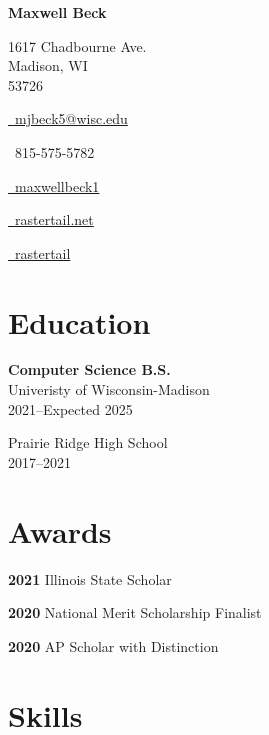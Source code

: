 \documentclass[letterpaper,10pt]{article}
\begin{document}
\raggedright
\begin{paracol}{2}

    \begin{center}

        {\LARGE \bfseries Maxwell Beck}

        \medskip

        1617 Chadbourne Ave. \\
        Madison, WI \\
        53726 \\

        \medskip

        \href{mailto:mjbeck5@wisc.edu}{\faEnvelopeO\, mjbeck5@wisc.edu}

        \faPhone\,
        815-575-5782

        \href{https://www.linkedin.com/in/maxwellbeck1}{\faLinkedin\, maxwellbeck1}

        \href{https://rastertail.net/}{\faChain\, rastertail.net}

        \href{https://github.com/rastertail}{\faGithub\, rastertail}

    \end{center}

    \section*{Education}

    \textbf{Computer Science B.S.} \\
    Univeristy of Wisconsin-Madison \\
    2021--Expected 2025

    \medskip

    Prairie Ridge High School \\
    2017--2021

    \section*{Awards}

    \textbf{2021} Illinois State Scholar

    \medskip

    \textbf{2020} National Merit Scholarship Finalist

    \medskip

    \textbf{2020} AP Scholar with Distinction

    \section*{Skills}


\end{paracol}
\end{document}
